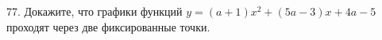 77. Докажите, что графики функций $y=(a+1)x^2+(5a-3)x+4a-5$ проходят через две фиксированные точки.\\
